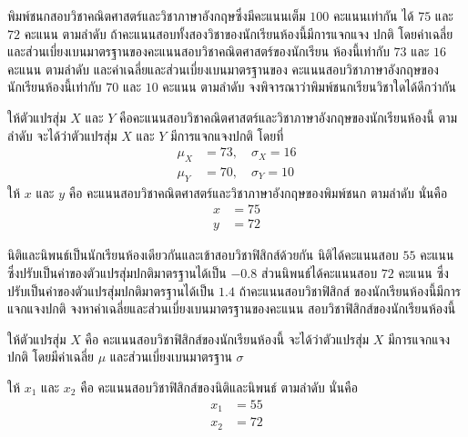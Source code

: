 \begin{examplebox}
พิมพ์ชนกสอบวิชาคณิตศาสตร์และวิชาภาษาอังกฤษซึ่งมีคะแนนเต็ม $100$ คะแนนเท่ากัน ได้ $75$ และ $72$ คะแนน ตามลำดับ ถ้าคะแนนสอบทั้งสองวิชาของนักเรียนห้องนี้มีการแจกแจง ปกติ โดยค่าเฉลี่ยและส่วนเบี่ยงเบนมาตรฐานของคะแนนสอบวิชาคณิตศาสตร์ของนักเรียน ห้องนี้เท่ากับ $73$ และ $16$ คะแนน ตามลำดับ และค่าเฉลี่ยและส่วนเบี่ยงเบนมาตรฐานของ คะแนนสอบวิชาภาษาอังกฤษของนักเรียนห้องนี้เท่ากับ $70$ และ $10$ คะแนน ตามลำดับ จงพิจารณาว่าพิมพ์ชนกเรียนวิชาใดได้ดีกว่ากัน
\end{examplebox}
\solution ให้ตัวแปรสุ่ม $X$ และ $Y$ คือคะแนนสอบวิชาคณิตศาสตร์และวิชาภาษาอังกฤษของนักเรียนห้องนี้ ตามลำดับ จะได้ว่าตัวแปรสุ่ม $X$ และ $Y$ มีการแจกแจงปกติ โดยที่
\begin{align*}
	\mu_{X} &= 73, \quad \sigma_{X} = 16 \\
	\mu_{Y} &= 70, \quad \sigma_{Y} = 10
\end{align*}
ให้ $x$ และ $y$ คือ คะแนนสอบวิชาคณิตศาสตร์และวิชาภาษาอังกฤษของพิมพ์ชนก ตามลำดับ นั่นคือ
\begin{align*}
	x &= 75 \\
	y &= 72
\end{align*}

\newpage

\begin{examplebox}
นิติและนิพนธ์เป็นนักเรียนห้องเดียวกันและเข้าสอบวิชาฟิสิกส์ด้วยกัน นิติได้คะแนนสอบ $55$ คะแนน ซึ่งปรับเป็นค่าของตัวแปรสุ่มปกติมาตรฐานได้เป็น $-0.8$ ส่วนนิพนธ์ได้คะแนนสอบ $72$ คะแนน ซึ่งปรับเป็นค่าของตัวแปรสุ่มปกติมาตรฐานได้เป็น $1.4$ ถ้าคะแนนสอบวิชาฟิสิกส์ ของนักเรียนห้องนี้มีการแจกแจงปกติ จงหาค่าเฉลี่ยและส่วนเบี่ยงเบนมาตรฐานของคะแนน สอบวิชาฟิสิกส์ของนักเรียนห้องนี้
\end{examplebox}
\solution ให้ตัวแปรสุ่ม $X$ คือ คะแนนสอบวิชาฟิสิกส์ของนักเรียนห้องนี้ จะได้ว่าตัวแปรสุ่ม $X$ มีการแจกแจงปกติ โดยมีค่าเฉลี่ย $\mu$ และส่วนเบี่ยงเบนมาตรฐาน $\sigma$

ให้ $x_{1}$ และ $x_{2}$ คือ คะแนนสอบวิชาฟิสิกส์ของนิติและนิพนธ์ ตามลำดับ นั่นคือ
\begin{align*}
	x_{1} &= 55 \\
	x_{2} &= 72
\end{align*}
